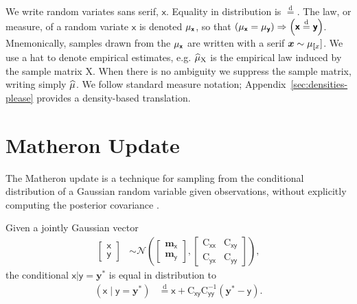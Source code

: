 \documentclass[runningheads]{llncs}
\newcommand{\vv}[1]{\boldsymbol{#1}}
\newcommand{\mm}[1]{\mathrm{#1}}
\newcommand{\rv}[1]{\mathsf{#1}}
\newcommand{\vrv}[1]{\vv{\rv{#1}}}
\newcommand{\disteq}{\stackrel{\mathrm{d}}{=}}
\newcommand{\Normal}{\mathcal{N}}
\newcommand{\gvn}{\mid}
\begin{document}
We write random variates sans serif, $\vrv{x}$.
Equality in distribution is $\disteq$.
The law, or measure, of a random variate $\vrv{x}$ is denoted $\Law[\vrv{x}]$,
so that $\left(\Law[\vrv{x}]=\Law[\vrv{y}]\right) \Rightarrow \left(\vrv{x}\disteq\vrv{y}\right)$.
Mnemonically, samples drawn from the $\Law[\vrv{x}]$ are written with a serif $\vv{x}\sim\Law[\vrv[x]]$.
We use a hat to denote empirical estimates, e.g. \(\ELaw[\mm{X}]\) is the empirical law induced by the sample matrix \(\mm{X}\).
When there is no ambiguity we suppress the sample matrix, writing simply \(\widehat{\Law}\).
We follow standard measure notation; Appendix~\ref{sec:densities-please} provides a density-based translation.

\section{Matheron Update}

The Matheron update is a technique for sampling from the conditional distribution of a Gaussian random variable given observations, without explicitly computing the posterior covariance \cite{Doucet2010Note,Wilson2020Efficiently,Wilson2021Pathwise}.

\begin{lemma}
Given a jointly Gaussian vector
\begin{align}
    \begin{bmatrix} \vrv{x} \\ \vrv{y} \end{bmatrix}
    &\sim \Normal\left(\begin{bmatrix} \vv{m}_{\vrv{x}} \\ \vv{m}_{\vrv{y}} \end{bmatrix}, \begin{bmatrix} \mm{C}_{\vrv{xx}} & \mm{C}_{\vrv{xy}} \\ \mm{C}_{\vrv{yx}} & \mm{C}_{\vrv{yy}} \end{bmatrix}\right), \label{eq:joint-gaussian}
\end{align}
the conditional $\vrv{x} | \vrv{y} {=} \vv{y}^*$ is equal in distribution to
\begin{align}
    \left(\vrv{x} \gvn \vrv{y} {=} \vv{y}^*\right)
    &\disteq \vrv{x} + \mm{C}_{\vrv{xy}} \mm{C}_{\vrv{yy}}^{-1} \left( \vv{y}^* - \vrv{y} \right).
    \label{eq:matheron-update}
\end{align}
\end{lemma}
\end{document}
